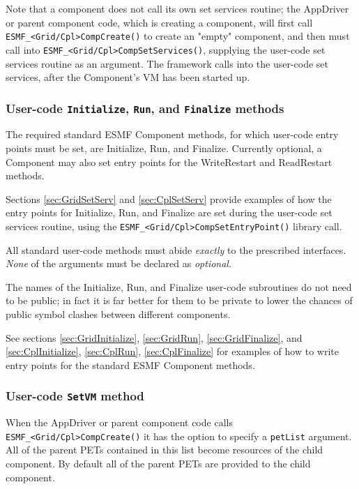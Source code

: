 Note that a component does not call its own set services routine;
the AppDriver or parent component code, which is creating a component, 
will first call {\tt ESMF\_<Grid/Cpl>CompCreate()} to create an "empty" 
component, and then must call into {\tt ESMF\_<Grid/Cpl>CompSetServices()}, 
supplying the user-code set services routine as an argument. The framework
calls into the user-code set services, after the Component's VM has been
started up.


\subsubsection{User-code {\tt Initialize}, {\tt Run}, and {\tt Finalize} methods}

The required standard ESMF Component methods, for which user-code entry
points must be set, are Initialize, Run, and Finalize. Currently optional,
a Component may also set entry points for the WriteRestart and
ReadRestart methods.

Sections \ref{sec:GridSetServ} and \ref{sec:CplSetServ} provide examples
of how the entry points for Initialize, Run, and Finalize are set during
the user-code set services routine, using the 
{\tt ESMF\_<Grid/Cpl>CompSetEntryPoint()} library call.

All standard user-code methods must abide {\em exactly} to the prescribed
interfaces. {\em None} of the arguments must be declared as {\em optional}.

The names of the Initialize, Run, and Finalize user-code subroutines do
not need to be public; in fact it is far better for them to be private to
lower the chances of public symbol clashes between different components.

See sections \ref{sec:GridInitialize}, \ref{sec:GridRun},
\ref{sec:GridFinalize}, and \ref{sec:CplInitialize}, \ref{sec:CplRun},
\ref{sec:CplFinalize} for examples of how to write entry points for the 
standard ESMF Component methods.


\subsubsection{User-code {\tt SetVM} method}
\label{sec:AppDriverSetVM}

When the AppDriver or parent component code calls
{\tt ESMF\_<Grid/Cpl>CompCreate()} it has the option to specify a 
{\tt petList} argument. All of the parent PETs contained in this list become
resources of the child component. By default all of the parent PETs are 
provided to the child component.

